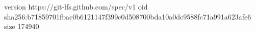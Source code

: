 version https://git-lfs.github.com/spec/v1
oid sha256:b71859701fbac0b6121147f399c0d508700bda10a0dc9588fc71a991a623afe6
size 174940
